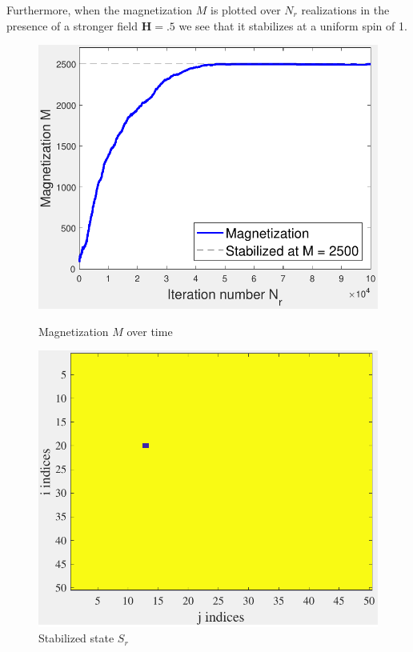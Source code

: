 \documentclass{article}
\begin{document}
\noindent Furthermore, when the magnetization $M$ is plotted over $N_r$ realizations in the presence of a stronger field $\textbf{H} = .5$ we see that it stabilizes at a uniform spin of 1.
\\
\begin{figure}[H]
  \centering
  \begin{minipage}[b]{0.49\textwidth}
    \includegraphics[width=\textwidth]{Mplot.pdf}
    \caption{Magnetization $M$ over time}

  \end{minipage}
  \hfill
  \begin{minipage}[b]{0.49\textwidth}
    \includegraphics[width=\textwidth]{Suniform.pdf}
    \caption{Stabilized state $S_r$}

  \end{minipage}
\end{figure}
\end{document}
